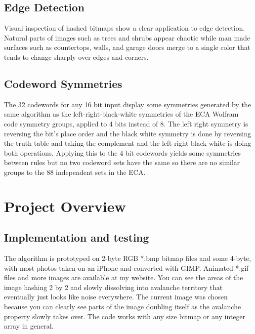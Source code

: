 \documentclass[11pt]{article}
\begin{document}
\subsection{Edge Detection}

Visual inspection of hashed bitmaps show a clear application to edge detection. Natural parts of images such as trees and shrubs appear chaotic while man made surfaces such as countertops, walls, and garage doors merge to a single color that tends to change sharply over edges and corners.\\

\subsection{Codeword Symmetries}
The 32 codewords for any 16 bit input display some symmetries generated by the same algorithm as the left-right-black-white symmetries of the ECA Wolfram code symmetry groups, applied to 4 bits instead of 8. The left right symmetry is reversing the bit's place order and the black white symmetry is done by reversing the truth table and taking the complement and the left right black white is doing both operations. Applying this to the 4 bit codewords yields some symmetries between rules but no two codeword sets have the same so there are no similar groups to the 88 independent sets in the ECA.\cite{Wolfram}\\

\section{Project Overview}

\subsection{Implementation and testing}

The algorithm is prototyped on 2-byte RGB *.bmp bitmap files and some 4-byte, with most photos taken on an iPhone and converted with GIMP. Animated *.gif files and more images are available at my website. You can see the areas of the image hashing 2 by 2 and slowly dissolving into avalanche territory that eventually just looks like noise everywhere. The current image was chosen because you can clearly see parts of the image doubling itself as the avalanche property slowly takes over. The code works with any size bitmap or any integer array in general. \\
\end{document}
